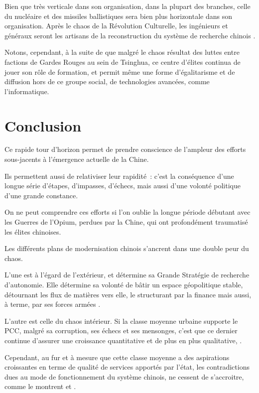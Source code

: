 \documentclass[a4paper]{article}
\begin{document}
Bien que très verticale dans son organisation, dans la plupart des branches, celle du nucléaire et des missiles ballistiques sera bien plus horizontale dans son organisation. Après le chaos de la Révolution Culturelle, les ingénieurs et généraux seront les artisans de la reconstruction du système de recherche chinois \cite{feigenbaum03_chinas}.

Notons, cependant, à la suite de \cite{andreas09_rise} que malgré le chaos résultat des luttes entre factions de Gardes Rouges au sein de Tsinghua, ce centre d’élites continua de jouer son rôle de formation, et permit même une forme d’égalitarisme et de diffusion hors de ce groupe social, de technologies avancées, comme l’in\-for\-ma\-ti\-que.

\section{Conclusion}
\label{sec:org522d513}
Ce rapide tour d’horizon permet de prendre conscience de l’ampleur des efforts sous-jacents à l’émergence actuelle de la Chine.

Ils permettent aussi de relativiser leur rapidité~: c’est la conséquence d’une longue série d’étapes, d’impasses, d’échecs, mais aussi d’une volonté politique d’une grande constance.

On ne peut comprendre ces efforts si l’on oublie la longue période débutant avec les Guerres de l’Opium, perdues par la Chine, qui ont profondément traumatisé les élites chinoises.

Les différents plans de modernisation chinois s’ancrent dans une double peur du chaos.

L’une est à l’égard de l’extérieur, et détermine sa Grande Stratégie de recherche d’autonomie. Elle détermine sa volonté de bâtir un espace géopolitique stable, détournant les flux de matières vers elle, le structurant par la finance mais aussi, à terme, par ses forces armées \cite{khan18_haunt}. 

L’autre est celle du chaos intérieur. Si la classe moyenne urbaine supporte le PCC, malgré sa corruption, ses échecs et ses mensonges, c’est que ce dernier continue d’assurer une croissance quantitative et de plus en plus qualitative, \cite{dickson16}.

Cependant, au fur et à mesure que cette classe moyenne a des aspirations croissantes en terme de qualité de services apportés par l’état, les contradictions dues au mode de fonctionnement du système chinois, ne cessent de s’accroitre, comme le montrent \cite{cabestan18_demain_chine} et \cite{dickson16}.
\end{document}
